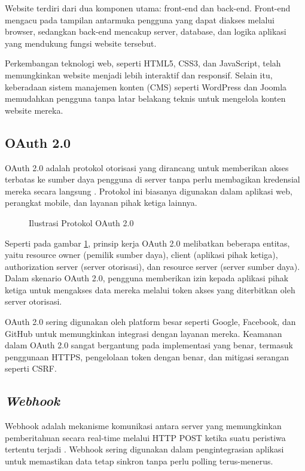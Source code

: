 Website terdiri dari dua komponen utama: front-end dan back-end. Front-end mengacu pada tampilan antarmuka pengguna yang dapat diakses melalui browser, sedangkan back-end mencakup server, database, dan logika aplikasi yang mendukung fungsi website tersebut.

Perkembangan teknologi web, seperti HTML5, CSS3, dan JavaScript, telah memungkinkan website menjadi lebih interaktif dan responsif. Selain itu, keberadaan sistem manajemen konten (CMS) seperti WordPress dan Joomla memudahkan pengguna tanpa latar belakang teknis untuk mengelola konten website mereka.

\subsection{OAuth 2.0}
OAuth 2.0 adalah protokol otorisasi yang dirancang untuk memberikan akses terbatas ke sumber daya pengguna di server tanpa perlu membagikan kredensial mereka secara langsung \cite{hardt2012}. Protokol ini biasanya digunakan dalam aplikasi web, perangkat mobile, dan layanan pihak ketiga lainnya.

\begin{figure}[H]
    \centering
    \caption{Ilustrasi Protokol OAuth 2.0}
    \label{fig:oauth}
\end{figure}

Seperti pada gambar \ref{fig:oauth}, prinsip kerja OAuth 2.0 melibatkan beberapa entitas, yaitu resource owner (pemilik sumber daya), client (aplikasi pihak ketiga), authorization server (server otorisasi), dan resource server (server sumber daya). Dalam skenario OAuth 2.0, pengguna memberikan izin kepada aplikasi pihak ketiga untuk mengakses data mereka melalui token akses yang diterbitkan oleh server otorisasi.

OAuth 2.0 sering digunakan oleh platform besar seperti Google, Facebook, dan GitHub untuk memungkinkan integrasi dengan layanan mereka. Keamanan dalam OAuth 2.0 sangat bergantung pada implementasi yang benar, termasuk penggunaan HTTPS, pengelolaan token dengan benar, dan mitigasi serangan seperti CSRF.

\subsection{\textit{Webhook}}
Webhook adalah mekanisme komunikasi antara server yang memungkinkan pemberitahuan secara real-time melalui HTTP POST ketika suatu peristiwa tertentu terjadi \cite{jain2021}. Webhook sering digunakan dalam pengintegrasian aplikasi untuk memastikan data tetap sinkron tanpa perlu polling terus-menerus.


